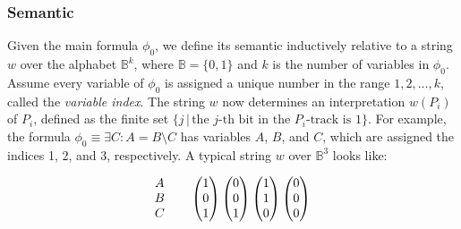 \documentclass[pdflatex,sn-mathphys-num]{sn-jnl}%
\theoremstyle{thmstyleone}%
\theoremstyle{thmstyletwo}%
\theoremstyle{thmstylethree}%
\begin{document}
        \subsubsection*{Semantic}
            Given the main formula $\phi_0$, we define its semantic inductively relative to a string $w$ over the alphabet $\mathbb{B}^k$, where $\mathbb{B} = \{0, 1\}$ and $k$ is the number of variables in $\phi_0$. Assume every variable of $\phi_0$ is assigned a unique number in the range $1, 2, \dots, k$, called the \textit{variable index}. The string $w$ now determines an interpretation $w(P_i)$ of $P_i$, defined as the finite set $\{j \,|\, \text{the } j\text{-th bit in the } P_i\text{-track is 1}\}$. For example, the formula $\phi_0 \equiv \exists C : A = B \setminus C$ has variables $A$, $B$, and $C$, which are assigned the indices 1, 2, and 3, respectively. A typical string $w$ over $\mathbb{B}^3$ looks like:

            $$
            \begin{matrix}
                A\\
                B\\
                C
            \end{matrix}
            \hspace*{2em}
            \begin{pmatrix}
                1\\
                0\\
                1
            \end{pmatrix}
            \begin{pmatrix}
                0\\
                0\\
                1
            \end{pmatrix}
            \begin{pmatrix}
                1\\
                1\\
                0
            \end{pmatrix}
            \begin{pmatrix}
                0\\
                0\\
                0\\
            \end{pmatrix}
            $$

            \vspace*{0.5em}
\end{document}
